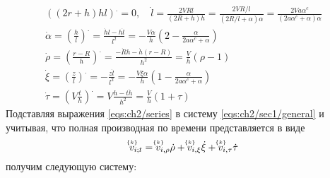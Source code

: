 \begin{subequations}
  \begin{gather}
    \left(\left(2r+h\right)h l\right)^. = 0, \quad \dot{l} = \frac{2 V R l}{\left(2R + h\right)h}=\frac{2 V R/l}{\left(2R/l + \alpha\right)\alpha}=\frac{2 V a \alpha^c}{\left(2a \alpha^c + \alpha\right)\alpha}\nonumber
    \\
    \dot{\alpha} = \left(\frac{h}{l}\right)^. = \frac{\dot{h}l - h\dot{l}}{l^2} = -\frac{V\alpha}{h}\left(2-\frac{\alpha}{2a\alpha^c+\alpha}\right)
    \\
    \dot{\rho} = \left(\frac{r-R}{h}\right)^. = \frac{-\dot{R} h - \dot{h}\left(r-R\right)}{h^2} = \frac{V}{h}\left(\rho-1\right)
    \\
    \dot{\xi} = \left(\frac{z}{l}\right)^. = -\frac{z \dot{l}}{l^2} = -\frac{V\xi\alpha}{h}\left(1-\frac{\alpha}{2a\alpha^c+\alpha}\right)
    \\
    \dot{\tau} = \left(V \frac{t}{h}\right)^. = V \frac{h - t\dot{h}}{h^2} = \frac{V}{h} \left(1+\tau\right)
  \end{gather}
\end{subequations}
Подставляя выражения \cref{eqs:ch2/series} в систему \cref{eqs:ch2/sec1/general} и учитывая, что полная производная по времени представляется в виде
\begin{equation*}
  \uindex{v}{k}_{i;t} = \uindex{v}{k}_{i,\rho} \dot{\rho} + \uindex{v}{k}_{i,\xi} \dot{\xi} + \uindex{v}{k}_{i,\tau} \dot{\tau}
\end{equation*}
получим следующую систему:
\begingroup
\allowdisplaybreaks
